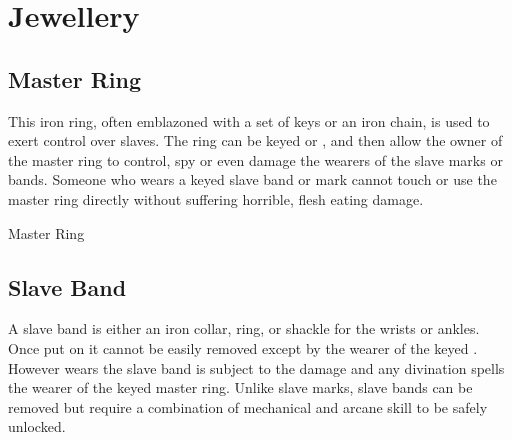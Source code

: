 \section{Jewellery}
\label{sec:Jewellery}

\subsection{Master Ring}
\label{sec:Master Ring}

This iron ring, often emblazoned with a set of keys or an iron chain, is used
to exert control over slaves. The ring can be keyed 
or , and then allow the owner of the master ring to
control, spy or even damage the wearers of the slave marks or bands. Someone
who wears a keyed slave band or mark cannot touch or use the master ring
directly without suffering horrible, flesh eating damage.

\begin{35e}{Master Ring}
\end{35e}

\subsection{Slave Band}
\label{sec:Slave Band}

A slave band is either an iron collar, ring, or shackle for the wrists or
ankles. Once put on it cannot be easily removed except by the wearer of the
keyed . However wears the slave band is subject to
the damage and any divination spells the wearer of the keyed master ring.
Unlike slave marks, slave bands can be removed but require a combination of
mechanical and arcane skill to be safely unlocked.

